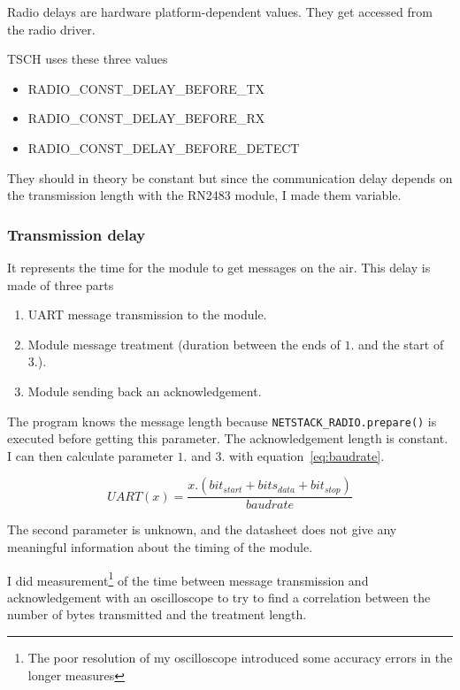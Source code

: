 Radio delays are hardware platform-dependent values. 
They get accessed from the radio driver.

TSCH uses these three values

\begin{itemize}
  \item RADIO\_CONST\_DELAY\_BEFORE\_TX
  \item RADIO\_CONST\_DELAY\_BEFORE\_RX
  \item RADIO\_CONST\_DELAY\_BEFORE\_DETECT
\end{itemize}

They should in theory be constant but since the communication delay depends
on the transmission length with the RN2483 module, I made them variable.


\subsubsection{Transmission delay}

It represents the time for the module to get messages on the air. 
This delay is made of three parts

\begin{enumerate}
  \item UART message transmission to the module.
  \item Module message treatment (duration between the ends of $1.$ and the start of $3.$).
  \item Module sending back an acknowledgement.
\end{enumerate}

The program knows the message length because
\lstinline{NETSTACK_RADIO.prepare()} is executed before getting this parameter.
The acknowledgement length is constant. 
I can then calculate parameter $1.$ and $3.$ with equation~\ref{eq:baudrate}.

\begin{equation}
  \label{eq:baudrate}
  UART(x) = \frac{x . (bit_{start} + bits_{data} + bit_{stop})}{baudrate}
\end{equation}

The second parameter is unknown, and the datasheet does not give any meaningful
information about the timing of the module.

I did measurement\footnote{The poor resolution of my oscilloscope introduced
some accuracy errors in the longer measures} of the time between message
transmission and acknowledgement with an oscilloscope to try to find a
correlation between the number of bytes transmitted and the treatment length.

